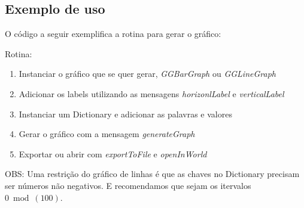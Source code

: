 
	\subsection{Exemplo de uso}
		O código a seguir exemplifica a rotina para gerar o gráfico:\\


		Rotina:
		\begin{enumerate}
			\item Instanciar o gráfico que se quer gerar, \emph{GGBarGraph} ou \emph{GGLineGraph}
			\item Adicionar os labels utilizando as mensagens \emph{horizonlLabel} e \emph{verticalLabel}
			\item Instanciar um Dictionary e adicionar as palavras e valores
			\item Gerar o gráfico com a mensagem \emph{generateGraph}
			\item Exportar ou abrir com \emph{exportToFile} e \emph{openInWorld}
		\end{enumerate}

		OBS: Uma restrição do gráfico de linhas é que as chaves no Dictionary precisam ser números não
		negativos. E recomendamos que sejam os itervalos $0 \bmod(100)$.\\

